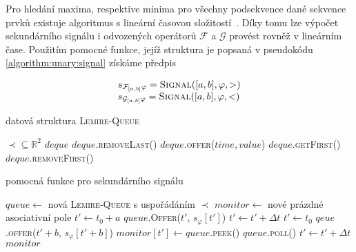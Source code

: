 Pro hledání maxima,
respektive minima pro všechny podsekvence dané sekvence prvků existuje algoritmus s lineární časovou složitostí~\cite{lemire2006}. Díky tomu lze
výpočet sekundárního signálu i odvozených operátorů $\mathcal{F}$ a $\mathcal{G}$ pro\-vést
rovněž v lineárním čase. Použitím pomocné funkce, jejíž struktura je popsaná v pseudokódu \ref{algorithm:unary:signal}
získáme předpis 

\begin{align}\label{eq:future:gloabally:robustness:impl}
\begin{array}{ll}
s_{\mathcal{F}_{[a,b]}\varphi} = \textsc{Signal}([a,b], \varphi, >)				\\
s_{\mathcal{G}_{[a,b]}\varphi} = \textsc{Signal}([a,b], \varphi, <)
\end{array}
\end{align}

\begin{algorithm}
\caption{datová struktura \textsc{Lemire-Queue}\cite{lemire2006}}
\begin{algorithmic}[1]
\Require 	$\prec \subseteq \mathbb{R}^2$ 
\State $deque$ 
		\State $deque$.\textsc{removeLast()}
	\EndWhile
	\State $deque$.\textsc{offer(}$time, value$\textsc{)}
\EndFunction
{}
	\State\Return $deque$.\textsc{getFirst()}
\EndFunction
{}
	\State\Return $deque$.\textsc{removeFirst()}
\EndFunction
\end{algorithmic}
\end{algorithm}

\begin{algorithm}
\caption{pomocná funkce pro sekundárního signálu}
\label{algorithm:unary:signal}
\begin{algorithmic}[1]
	\State	$queue \gets $ nová \textsc{Lemire-Queue} s uspořádáním $\prec$
	\State	$monitor \gets$ nové prázdné asociativní pole
	\State	$t' \gets t_0 + a$
		\State $queue$.\textsc{Offer}($t'$, $s_\varphi[t']$)
		\State $t' \gets t' + \Delta t$
	\EndWhile
	\State	$t' \gets t_0$
		\State	$qeue$.\textsc{offer}($t' + b$, $s_\varphi[t' + b]$)
		\State	$monitor[t'] \gets queue$.\textsc{peek()}
			\State	$queue$.\textsc{poll()}
		\EndIf
		\State	$t' \gets t' + \Delta t$
	\EndWhile
	\State\Return $monitor$
\EndFunction
\end{algorithmic}
\end{algorithm}


